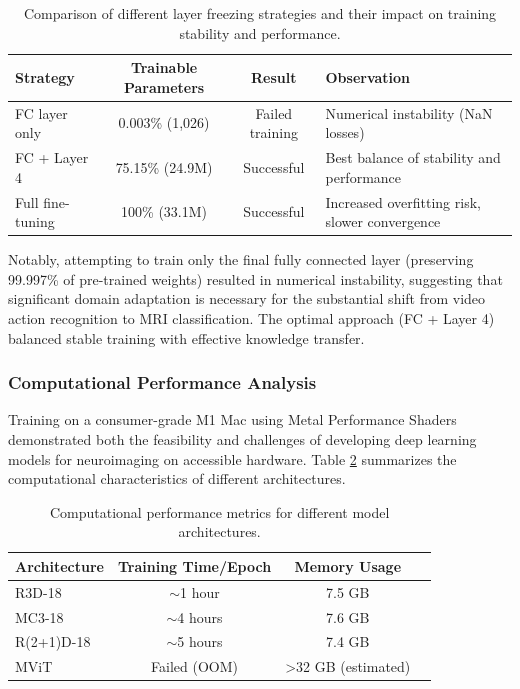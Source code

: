 \documentclass[11pt, a4paper]{article}
\begin{document}
\begin{table}[htbp]
\centering
\begin{tabular}{|l|c|c|p{4cm}|}
\hline
\textbf{Strategy} & \textbf{Trainable Parameters} & \textbf{Result} & \textbf{Observation} \\
\hline
FC layer only & 0.003\% (1,026) & Failed training & Numerical instability (NaN losses) \\
\hline
FC + Layer 4 & 75.15\% (24.9M) & Successful & Best balance of stability and performance \\
\hline
Full fine-tuning & 100\% (33.1M) & Successful & Increased overfitting risk, slower convergence \\
\hline
\end{tabular}
\caption{Comparison of different layer freezing strategies and their impact on training stability and performance.}
\label{tab:freezing_strategies}
\end{table}

Notably, attempting to train only the final fully connected layer (preserving 99.997\% of pre-trained weights) resulted in numerical instability, suggesting that significant domain adaptation is necessary for the substantial shift from video action recognition to MRI classification. The optimal approach (FC + Layer 4) balanced stable training with effective knowledge transfer.

\subsubsection{Computational Performance Analysis}

Training on a consumer-grade M1 Mac using Metal Performance Shaders demonstrated both the feasibility and challenges of developing deep learning models for neuroimaging on accessible hardware. Table \ref{tab:computational_performance} summarizes the computational characteristics of different architectures.

\begin{table}[htbp]
\centering
\begin{tabular}{|l|c|c|c|}
\hline
\textbf{Architecture} & \textbf{Training Time/Epoch} & \textbf{Memory Usage} \\
\hline
R3D-18 & $\sim$1 hour & 7.5 GB \\
\hline
MC3-18 & $\sim$4 hours & 7.6 GB \\
\hline
R(2+1)D-18 & $\sim$5 hours & 7.4 GB \\
\hline
MViT & Failed (OOM) & >32 GB (estimated) \\
\hline
\end{tabular}
\caption{Computational performance metrics for different model architectures.}
\label{tab:computational_performance}
\end{table}
\end{document}
